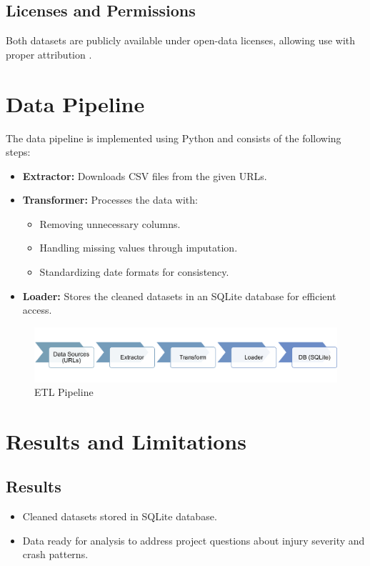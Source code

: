 \documentclass[a4paper,10pt]{article}
\begin{document}
\subsection{Licenses and Permissions}
Both datasets are publicly available under open-data licenses, allowing use with proper attribution \cite{traffic_crashes_people, traffic_crashes_vehicles}.

\section{Data Pipeline}
The data pipeline is implemented using Python and consists of the following steps:
\begin{itemize}
    \item \textbf{Extractor:} Downloads CSV files from the given URLs.
    \item \textbf{Transformer:} Processes the data with:
        \begin{itemize}
            \item Removing unnecessary columns.
            \item Handling missing values through imputation.
            \item Standardizing date formats for consistency.
        \end{itemize}
    \item \textbf{Loader:} Stores the cleaned datasets in an SQLite database for efficient access.
\end{itemize}

\begin{figure}
    \centering
    \includegraphics[width=1\linewidth]{images/Picture1.png}
    \caption{ETL Pipeline}
    \label{fig:ETL-pipeline}
\end{figure}

\section{Results and Limitations}
\subsection{Results}
\begin{itemize}
    \item Cleaned datasets stored in SQLite database.
    \item Data ready for analysis to address project questions about injury severity and crash patterns.
\end{itemize}
\end{document}
